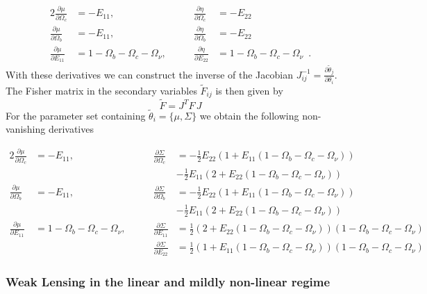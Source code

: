 \begin{alignat}{2}
\frac{\partial\mu}{\partial\Omega_{c}} & =-E_{11},\qquad &
\frac{\partial\eta}{\partial\Omega_{c}} & =-E_{22}\\
\frac{\partial\mu}{\partial\Omega_{b}} & =-E_{11},\qquad &
\frac{\partial\eta}{\partial\Omega_{b}} & =-E_{22}\\
\frac{\partial\mu}{\partial E_{11}} &
=1-\Omega_{b}-\Omega_{c}-\Omega_{\nu},\qquad & \frac{\partial\eta}{\partial
	E_{22}} & =1-\Omega_{b}-\Omega_{c}-\Omega_{\nu} \,\,\, .
\end{alignat}
With these derivatives we can construct the inverse of the Jacobian
$J_{ij}^{-1}=\frac{\partial\tilde{\theta}_{j}}{\partial\theta_{i}}$.
The Fisher matrix in the secondary variables $\tilde{F}{}_{ij}$ is
then given by 
\begin{equation}
\tilde{F}=J^{T}F\,J
\end{equation}
For the parameter set containing $\tilde{\theta}_{i}=\{\mu,\Sigma\}$
we obtain the following non-vanishing derivatives

\begin{alignat}{2}
\frac{\partial\mu}{\partial\Omega_{c}} & =-E_{11},\qquad &
\frac{\partial\Sigma}{\partial\Omega_{c}} &
=-\frac{1}{2}E_{22}(1+E_{11}(1-\Omega_{b}-\Omega_{c}-\Omega_{\nu}))\\
&  &  & -\frac{1}{2}E_{11}(2+E_{22}(1-\Omega_{b}-\Omega_{c}-\Omega_{\nu}))\\
\frac{\partial\mu}{\partial\Omega_{b}} & =-E_{11},\qquad &
\frac{\partial\Sigma}{\partial\Omega_{b}} &
=-\frac{1}{2}E_{22}(1+E_{11}(1-\Omega_{b}-\Omega_{c}-\Omega_{\nu}))\\
&  &  & -\frac{1}{2}E_{11}(2+E_{22}(1-\Omega_{b}-\Omega_{c}-\Omega_{\nu}))\\
\frac{\partial\mu}{\partial E_{11}} &
=1-\Omega_{b}-\Omega_{c}-\Omega_{\nu},\qquad & \frac{\partial\Sigma}{\partial
	E_{11}} &
=\frac{1}{2}(2+E_{22}(1-\Omega_{b}-\Omega_{c}-\Omega_{\nu}))(1-\Omega_{b}-\Omega_{c}-\Omega_{\nu})\\
&  & \frac{\partial\Sigma}{\partial E_{22}} &
=\frac{1}{2}(1+E_{11}(1-\Omega_{b}-\Omega_{c}-\Omega_{\nu}))(1-\Omega_{b}-\Omega_{c}-\Omega_{\nu})
\end{alignat}

\subsubsection{Weak Lensing in the linear and mildly non-linear regime}

